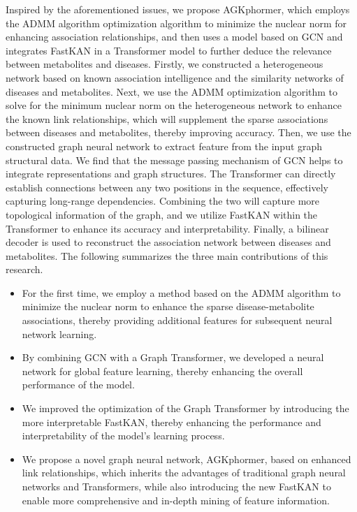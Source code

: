 \documentclass[a4paper,fleqn]{cas-dc}
\begin{document}
Inspired by the aforementioned issues, we propose AGKphormer, which employs the ADMM algorithm optimization algorithm to minimize the nuclear norm for enhancing association relationships, and then uses a model based on GCN and integrates FastKAN in a Transformer model to further deduce the relevance between metabolites and diseases. 
Firstly, we constructed a heterogeneous network based on known association intelligence and the similarity networks of diseases and metabolites. Next, we use the ADMM\cite{MAL-016} optimization algorithm to solve for the minimum nuclear norm on the heterogeneous network to enhance the known link relationships, which will supplement the sparse associations between diseases and metabolites, thereby improving accuracy.
Then, we use the constructed graph neural network to extract feature from the input graph structural data. We find that the message passing mechanism of GCN helps to integrate representations and graph structures. 
The Transformer can directly establish connections between any two positions in the sequence, effectively capturing long-range dependencies. 
Combining the two will capture more topological information of the graph, and we utilize FastKAN within the Transformer to enhance its accuracy and interpretability. 
Finally, a bilinear decoder is used to reconstruct the association network between diseases and metabolites. The following summarizes the three main contributions of this research.
\begin{itemize}
	\item For the first time, we employ a method based on the ADMM algorithm to minimize the nuclear norm to enhance the sparse disease-metabolite associations, thereby providing additional features for subsequent neural network learning.
	
	\item By combining GCN with a Graph Transformer, we developed a neural network for global feature learning, thereby enhancing the overall performance of the model.
	
	\item We improved the optimization of the Graph Transformer by introducing the more interpretable FastKAN, thereby enhancing the performance and interpretability of the model's learning process.
	
	\item We propose a novel graph neural network, AGKphormer, based on enhanced link relationships, which inherits the advantages of traditional graph neural networks and Transformers, while also introducing the new FastKAN to enable more comprehensive and in-depth mining of feature information.
\end{itemize}
\end{document}
